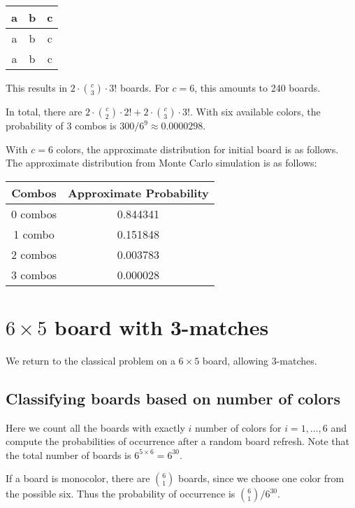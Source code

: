 \documentclass[12pt]{article}
\theoremstyle{definition}
\begin{document}
\begin{itemize}
\begin{itemize}
\begin{center}
            \qquad\qquad
            \begin{tabular}{|c|c|c|}
                \hline
                a & b & c \\
                \hline
                a & b & c \\
                \hline
                a & b & c \\
                \hline
            \end{tabular}
        \end{center}
        This results in $2\cdot \binom{c}{3}\cdot 3!$ boards. For $c=6$, this amounts to 240 boards.
    \end{itemize}
    In total, there are $2\cdot \binom{c}{2}\cdot 2!+2\cdot \binom{c}{3}\cdot 3!$. With six available colors, the probability of 3 combos is $300/6^9\approx 0.0000298$.
\end{itemize}
With $c=6$ colors, the approximate distribution for initial board is as follows.
The approximate distribution from Monte Carlo simulation is as follows:
\begin{center}
\begin{tabular}{|c|c|}
    \hline
    Combos & Approximate Probability \\
    \hline\hline
    0 combos & 0.844341 \\
    \hline
    1 combo & 0.151848 \\
    \hline
    2 combos & 0.003783 \\
    \hline
    3 combos & 0.000028 \\
    \hline
\end{tabular}
\end{center}
\section[6x5 board with 3-matches]{$6\times 5$ board with 3-matches}
We return to the classical problem on a $6\times 5$ board, allowing 3-matches.


\subsection{Classifying boards based on number of colors}

Here we count all the boards with exactly $i$ number of colors for $i=1,\dots,6$ and compute the probabilities of occurrence after a random board refresh. Note that the total number of boards is $6^{5\times 6}=6^{30}$.

If a board is monocolor, there are $\binom{6}{1}$ boards, since we choose one color from the possible six. Thus the probability of occurrence is $\binom{6}{1}/6^{30}$.
\end{document}
